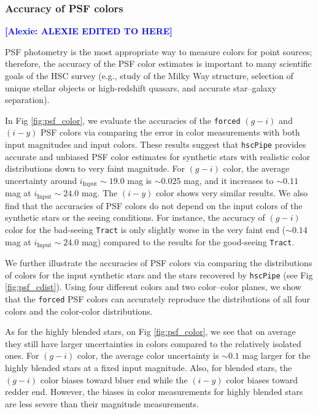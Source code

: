 \documentclass[useamsfonts]{pasj01}
\newcommand{\alexie}[1]{\textcolor{blue}{\textbf{[Alexie: #1]}}}
\def\hscpipe{\texttt{hscPipe}}
\def\forced{\texttt{forced}}
\def\tract{\texttt{Tract}}
\begin{document}
\subsubsection{Accuracy of PSF colors}

\alexie{ALEXIE EDITED TO HERE}

    PSF photometry is the most appropriate way to measure colors for point
    sources; therefore, the accuracy of the PSF color estimates is important to many 
    scientific goals of the HSC survey
    (e.g., study of the Milky Way structure, selection of unique stellar objects or
    high-redshift quasars, and accurate star--galaxy separation).

    In Fig \ref{fig:psf_color}, we evaluate the accuracies of the \forced{} $(g-i)$
    and $(i-y)$ PSF colors via comparing the error in color measurements with both
    input magnitudes and input colors.
    These results suggest that \hscpipe{} provides accurate and unbiased PSF color
    estimates for synthetic stars with realistic color distributions down to very 
    faint magnitude.
    For $(g-i)$ color, the average uncertainty around $i_{\mathrm{Input}}{\sim}19.0$ 
    mag is ${\sim}0.025$ mag, and it increases to ${\sim}0.11$ mag at
    $i_{\mathrm{Input}}{\sim}24.0$ mag.
    The $(i-y)$ color shows very similar results.
    We also find that the accuracies of PSF colors do not depend on the input colors 
    of the synthetic stars or the seeing conditions.
    For instance, the accuracy of $(g-i)$ color for the bad-seeing \tract{} is only
    slightly worse in the very faint end (${\sim}0.14$ mag at
    $i_{\mathrm{Input}}{\sim}24.0$ mag) compared to the results for the 
    good-seeing \tract{}.

    We further illustrate the accuracies of PSF colors via comparing the distributions
    of colors for the input synthetic stars and the stars recovered by \hscpipe{}
    (see Fig \ref{fig:psf_cdist}).
    Using four different colors and two color--color planes, we show that the 
    \forced{} PSF colors can accurately reproduce the distributions of all four colors 
    and the color-color distributions.

    As for the highly blended stars, on Fig \ref{fig:psf_color}, we see that on average
    they still have larger uncertainties in colors compared to the relatively isolated
    ones.
    For $(g-i)$ color, the average color uncertainty is ${\sim}0.1$ mag larger for the
    highly blended stars at a fixed input magnitude.
    Also, for blended stars, the $(g-i)$ color biases toward bluer end while the 
    $(i-y)$ color biases toward redder end.
    However, the biases in color measurements for highly blended stars are less severe 
    than their magnitude measurements.
\end{document}
